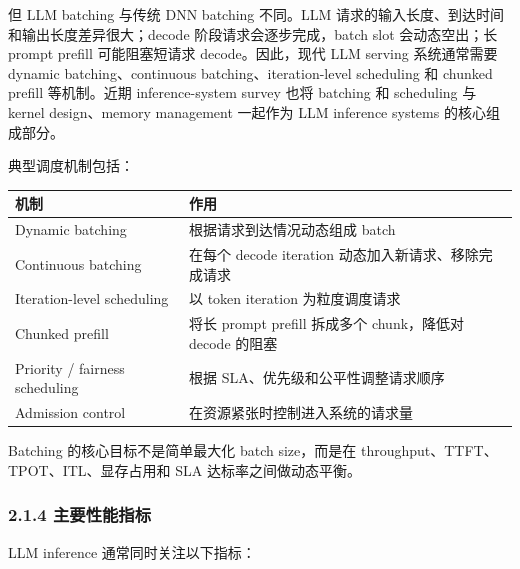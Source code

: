 \documentclass[a4paper,10pt]{ctexart}
\begin{document}
但 LLM batching 与传统 DNN batching 不同。LLM 请求的输入长度、到达时间和输出长度差异很大；decode 阶段请求会逐步完成，batch slot 会动态空出；长 prompt prefill 可能阻塞短请求 decode。因此，现代 LLM serving 系统通常需要 dynamic batching、continuous batching、iteration-level scheduling 和 chunked prefill 等机制。近期 inference-system survey 也将 batching 和 scheduling 与 kernel design、memory management 一起作为 LLM inference systems 的核心组成部分。 


典型调度机制包括：


\begin{table}[H]
\centering
\scriptsize
\setlength{\tabcolsep}{3pt}
\renewcommand{\arraystretch}{1.15}
\begin{tabularx}{\textwidth}{|X|X|}
\hline
\textbf{\textbf{机制}} & \textbf{\textbf{作用}} \\ \hline
Dynamic batching & 根据请求到达情况动态组成 batch \\ \hline
Continuous batching & 在每个 decode iteration 动态加入新请求、移除完成请求 \\ \hline
Iteration-level scheduling & 以 token iteration 为粒度调度请求 \\ \hline
Chunked prefill & 将长 prompt prefill 拆成多个 chunk，降低对 decode 的阻塞 \\ \hline
Priority / fairness scheduling & 根据 SLA、优先级和公平性调整请求顺序 \\ \hline
Admission control & 在资源紧张时控制进入系统的请求量 \\ \hline
\end{tabularx}
\end{table}


Batching 的核心目标不是简单最大化 batch size，而是在 throughput、TTFT、TPOT、ITL、显存占用和 SLA 达标率之间做动态平衡。




\subsubsection*{2.1.4 主要性能指标}

LLM inference 通常同时关注以下指标：
\end{document}
